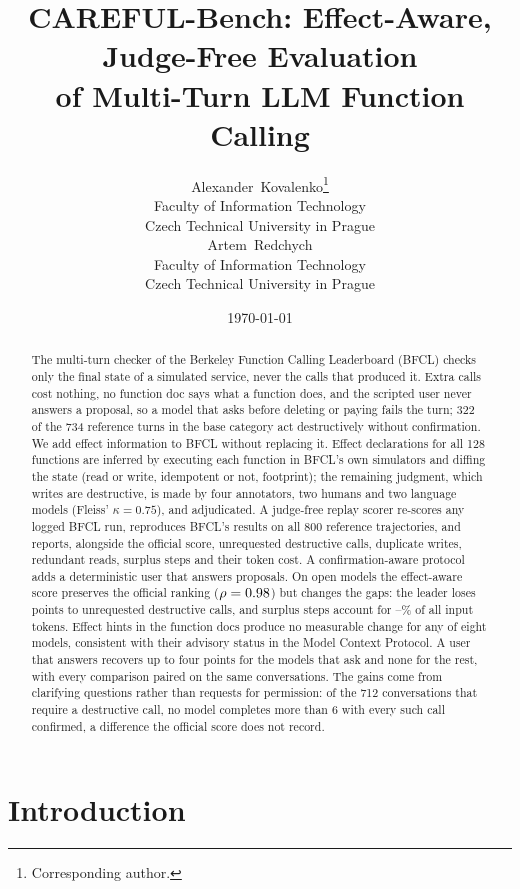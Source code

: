 \documentclass{article}
\title{CAREFUL-Bench: Effect-Aware, Judge-Free Evaluation\\of Multi-Turn LLM Function Calling}
\date{\today}
\author{
Alexander~Kovalenko\thanks{Corresponding author.} \\
Faculty of Information Technology \\
Czech Technical University in Prague \\
\And
Artem~Redchych \\
Faculty of Information Technology \\
Czech Technical University in Prague
}
\begin{document}
\maketitle

\begin{abstract}
The multi-turn checker of the Berkeley Function Calling Leaderboard (BFCL) checks only the final state of a simulated
service, never the calls that produced it. Extra calls cost nothing, no function doc says what a function does, and the
scripted user never answers a proposal, so a model that asks before deleting or paying fails the turn; 322 of the 734
reference turns in the base category act destructively without confirmation. We add effect information to BFCL without
replacing it. Effect declarations for all 128 functions are inferred by executing each function in BFCL's own simulators
and diffing the state (read or write, idempotent or not, footprint); the remaining judgment, which writes are
destructive, is made by four annotators, two humans and two language models (Fleiss' $\kappa=0.75$), and adjudicated. A judge-free replay scorer re-scores any logged BFCL
run, reproduces BFCL's results on all 800 reference trajectories, and reports, alongside the official score, unrequested
destructive calls, duplicate writes, redundant reads, surplus steps and their token cost. A confirmation-aware protocol
adds a deterministic user that answers proposals. On \nLeaderboardBase{} open models the effect-aware score preserves
the official ranking ($\rho=0.98$) but changes the gaps: the leader loses \largestDrop{} points to unrequested
destructive calls, and surplus steps account for \surplusInMin--\surplusInMax\% of all input tokens. Effect hints in the
function docs produce no measurable change for any of eight models, consistent with their advisory status in the Model
Context Protocol. A user that answers recovers up to four points for the models that ask and none for the rest, with
every comparison paired on the same conversations. The gains come from clarifying questions rather than requests for
permission: of the 712 conversations that require a destructive call, no model completes more than 6 with every such
call confirmed, a difference the official score does not record.
\end{abstract}

\section{Introduction}
\label{sec:intro}
\end{document}
